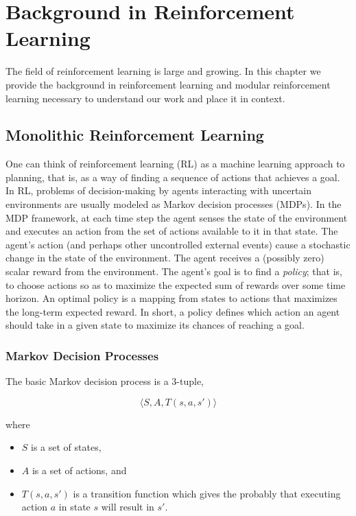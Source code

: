 \chapter{Background in Reinforcement Learning}\label{ch:rl}

The field of reinforcement learning is large and growing. In this chapter we provide the background in reinforcement learning and modular reinforcement learning necessary to understand our work and place it in context.

\section{Monolithic Reinforcement Learning}

One can think of reinforcement learning (RL) \cite{sutton1998reinforcement,kaelbling1996reinforcement} as a machine learning approach to planning, that is, as a way of finding a sequence of actions that achieves a goal. In RL, problems of decision-making by agents interacting with uncertain environments are usually modeled as Markov decision processes (MDPs). In the MDP framework, at each time step the agent senses the state of the environment and executes an action from the set of actions available to it in that state. The agent's action (and perhaps other uncontrolled external events) cause a stochastic change in the state of the environment. The agent receives a (possibly zero) scalar reward from the environment. The agent's goal is to find a {\it policy}; that is, to choose actions so as to maximize the expected sum of rewards over some time horizon. An optimal policy is a mapping from states to actions that maximizes the long-term expected reward.  In short, a policy defines which action an agent should take in a given state to maximize its chances of reaching a goal.

\subsection{Markov Decision Processes}

The basic Markov decision process is a 3-tuple,

\begin{equation}
\langle S, A, T(s, a, s') \rangle
\end{equation}

where

\begin{itemize}
\item $S$ is a set of states,
\item $A$ is a set of actions, and
\item $T(s, a, s')$ is a transition function which gives the probably that executing action $a$ in state $s$ will result in $s'$.
\end{itemize}

